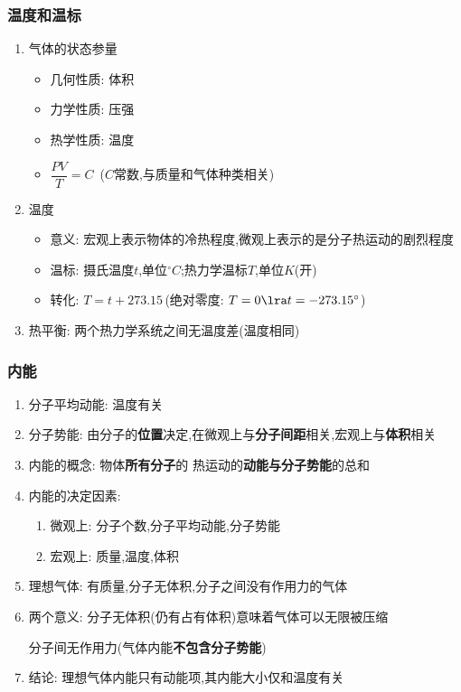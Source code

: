 \documentclass{article}
\begin{document}
\subsubsection{温度和温标}
\begin{enumerate}
    \item 气体的状态参量
          \begin{itemize}
              \item 几何性质: 体积
              \item 力学性质: 压强
              \item 热学性质: 温度
              \item $\dfrac{PV}{T} = C \,$ ($C$常数,与质量和气体种类相关)
          \end{itemize}
    \item 温度
          \begin{itemize}
              \item 意义: 宏观上表示物体的冷热程度,微观上表示的是分子热运动的剧烈程度
              \item 温标: 摄氏温度$t$,单位$^{\circ} C$;热力学温标$T$,单位$K$(开)
              \item 转化: $T = t + 273.15 \,$(绝对零度: $T = 0 \lra t = -273.15^{\circ} $)
          \end{itemize}
    \item 热平衡: 两个热力学系统之间无温度差(温度相同)
\end{enumerate}

\vspace{2em}

\subsubsection{内能}
\begin{enumerate}
    \item 分子平均动能: 温度有关
    \item 分子势能: 由分子的\textbf{位置}决定,在微观上与\textbf{分子间距}相关,宏观上与\textbf{体积}相关
    \item 内能的概念: 物体\textbf{所有分子}的 热运动的\textbf{动能与分子势能}的总和
    \item 内能的决定因素:
          \begin{enumerate}[label = (\arabic*)]
              \item 微观上: 分子个数,分子平均动能,分子势能
              \item 宏观上: 质量,温度,体积
          \end{enumerate}
    \item 理想气体: 有质量,分子无体积,分子之间没有作用力的气体
    \item 两个意义: 分子无体积(仍有占有体积)意味着气体可以无限被压缩
    
          \hspace{4.7em}分子间无作用力(气体内能\textbf{不包含分子势能})
    \item 结论: 理想气体内能只有动能项,其内能大小仅和温度有关
\end{enumerate}
\end{document}
